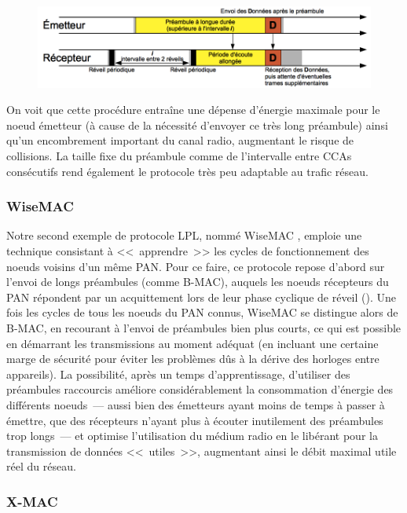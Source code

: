 \begin{figure}[!hbt]
\centering
\includegraphics[width=12.75cm]{images/ch3-b-mac.png}
\label{FigBMAC}
\end{figure}

On voit que cette procédure entraîne une dépense d'énergie maximale pour
le noeud émetteur (à cause de la nécessité d'envoyer ce très long préambule)
ainsi qu'un encombrement important du canal radio, augmentant le risque
de collisions. La taille fixe du préambule comme de l'intervalle entre CCAs
consécutifs rend également le protocole très peu adaptable au trafic réseau.

\subsubsection{WiseMAC}
\label{ParWiseMAC}

Notre second exemple de protocole LPL, nommé WiseMAC \cite{WiseMAC},
emploie une technique consistant à <<~apprendre~>> les cycles de
fonctionnement des noeuds voisins d'un même PAN. Pour ce faire, ce
protocole repose d'abord sur l'envoi de longs préambules (comme B-MAC),
auquels les noeuds récepteurs du PAN répondent par un acquittement lors
de leur phase cyclique de réveil ().
Une fois les cycles de tous les noeuds du PAN connus, WiseMAC se distingue
alors de B-MAC, en recourant à l'envoi de préambules bien plus courts,
ce qui est possible en démarrant les transmissions au moment adéquat
(en incluant une certaine marge de sécurité pour éviter les problèmes
dûs à la dérive des horloges entre appareils). La possibilité, après
un temps d'apprentissage, d'utiliser des préambules raccourcis améliore
considérablement la consommation d'énergie des différents noeuds~---
aussi bien des émetteurs ayant moins de temps à passer à émettre, que
des récepteurs n'ayant plus à écouter inutilement des préambules trop
longs~--- et optimise l'utilisation du médium radio en le libérant
pour la transmission de données <<~utiles~>>, augmentant ainsi le
débit maximal utile réel du réseau.

\subsubsection{X-MAC}
\label{ParXMAC}

